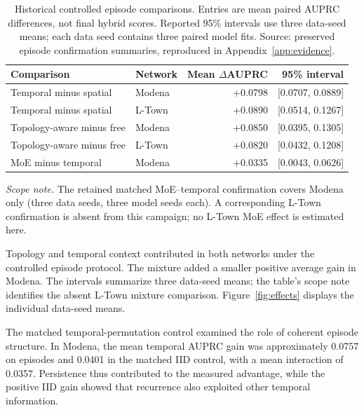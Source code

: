 \begin{table}[tbp]
\centering\small
\caption[Historical controlled episode comparisons]{Historical controlled episode comparisons. Entries are mean paired AUPRC differences, not final hybrid scores. Reported 95\% intervals use three data-seed means; each data seed contains three paired model fits. Source: preserved episode confirmation summaries, reproduced in Appendix~\ref{app:evidence}.}
\label{tab:historical}
\begin{tabular}{@{}llrr@{}}
\toprule
Comparison & Network & Mean $\Delta$AUPRC & 95\% interval\\
\midrule
Temporal minus spatial & Modena & +0.0798 & [0.0707, 0.0889]\\
Temporal minus spatial & L-Town & +0.0890 & [0.0514, 0.1267]\\
Topology-aware minus free & Modena & +0.0850 & [0.0395, 0.1305]\\
Topology-aware minus free & L-Town & +0.0820 & [0.0432, 0.1208]\\
MoE minus temporal & Modena & +0.0335 & [0.0043, 0.0626]\\
\bottomrule
\end{tabular}
\par\smallskip\begin{minipage}{\linewidth}\footnotesize\textit{Scope note.} The retained matched MoE--temporal confirmation covers Modena only (three data seeds, three model seeds each). A corresponding L-Town confirmation is absent from this campaign; no L-Town MoE effect is estimated here.\end{minipage}
\end{table}

Topology and temporal context contributed in both networks under the controlled episode protocol. The mixture added a smaller positive average gain in Modena. The intervals summarize three data-seed means; the table's scope note identifies the absent L-Town mixture comparison. Figure~\ref{fig:effects} displays the individual data-seed means.


The matched temporal-permutation control examined the role of coherent episode structure. In Modena, the mean temporal AUPRC gain was approximately 0.0757 on episodes and 0.0401 in the matched IID control, with a mean interaction of 0.0357. Persistence thus contributed to the measured advantage, while the positive IID gain showed that recurrence also exploited other temporal information.


